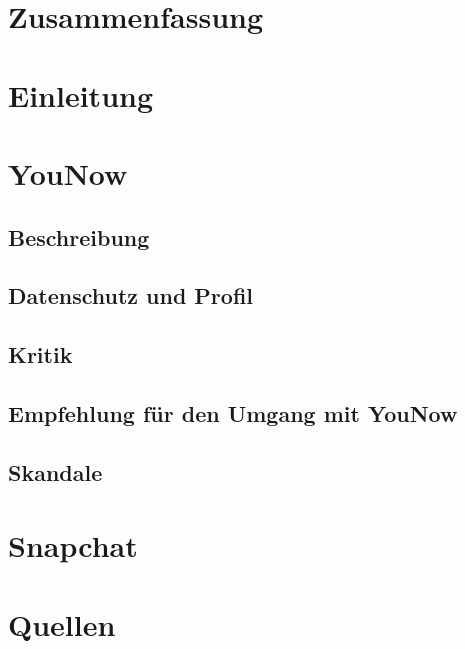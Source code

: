 \documentclass[a4paper,12pt]{scrartcl}
\begin{document}


\tableofcontents %
\pagebreak

\section{Zusammenfassung}



\section{Einleitung}


\section{YouNow}
\subsection{Beschreibung}

\subsection{Datenschutz und Profil}

\subsection{Kritik}

\subsection{Empfehlung für den Umgang mit YouNow}

\subsection{Skandale}


\section{Snapchat}




\pagebreak
\section{Quellen}

\end{document}
